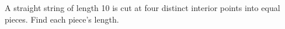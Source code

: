 A straight string of length 10 is cut at four distinct interior points into equal pieces. Find each piece's length.

